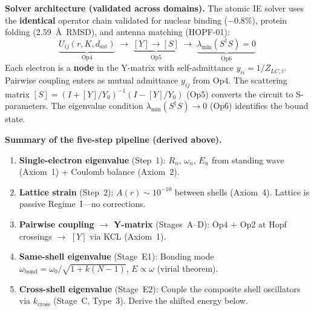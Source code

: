 \noindent\textbf{Solver architecture (validated across domains).}
The atomic IE solver uses the \textbf{identical} operator chain
validated for nuclear binding ($-0.8\%$), protein folding
(2.59~\AA\ RMSD), and antenna matching (HOPF-01):
\begin{equation}
    \underbrace{U_{ij}(r,K,d_{\text{sat}})}_{\text{Op4}}
    \;\longrightarrow\;
    \underbrace{[Y] \to [S]}_{\text{Op5}}
    \;\longrightarrow\;
    \underbrace{\lambda_{\min}(S^\dagger S) = 0}_{\text{Op6}}
    \label{eq:solver_chain}
\end{equation}
Each electron is a \textbf{node} in the Y-matrix with
self-admittance $y_{ii} = 1/Z_{LC,i}$.
Pairwise coupling enters as mutual admittance
$y_{ij}$ from Op4. The scattering matrix
$[S] = (I + [Y]/Y_0)^{-1}(I - [Y]/Y_0)$ (Op5)
converts the circuit to S-parameters.
The eigenvalue condition $\lambda_{\min}(S^\dagger S) \to 0$
(Op6) identifies the bound state.

\noindent\textbf{Summary of the five-step pipeline
(derived above).}
\begin{enumerate}
    \item \textbf{Single-electron eigenvalue} (Step~1):
          $R_n$, $\omega_n$, $E_n$ from standing wave
          (Axiom~1) + Coulomb balance (Axiom~2).
    \item \textbf{Lattice strain} (Step~2):
          $A(r) \sim 10^{-10}$ between shells (Axiom~4).
          Lattice is passive Regime~I---no corrections.
    \item \textbf{Pairwise coupling $\to$ Y-matrix}
          (Stages~A--D):
          Op4 $+$ Op2 at Hopf crossings $\to$ $[Y]$
          via KCL (Axiom~1).
    \item \textbf{Same-shell eigenvalue} (Stage~E1):
          Bonding mode $\omega_{\text{bond}}
          = \omega_0/\sqrt{1 + k(N{-}1)}$,
          $E \propto \omega$ (virial theorem).
    \item \textbf{Cross-shell eigenvalue} (Stage~E2):
          Couple the composite shell oscillators
          via $k_{\text{cross}}$ (Stage~C, Type~3).
          Derive the shifted energy below.
\end{enumerate}

